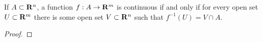 \begin{theorem}
    \label{topological continuity}
    If $A\subset \mathbf{R}^n$, a function $f:A\to \mathbf{R}^m$
    is continuous if and only if for every open
    set $U\subset\mathbf{R}^m$ there is some open set
    $V\subset\mathbf{R}^n$ such that $f^{-1}(U)=V\cap A$.
\end{theorem}

\begin{tcolorbox}
    \begin{proof}
        
    \end{proof}
\end{tcolorbox}